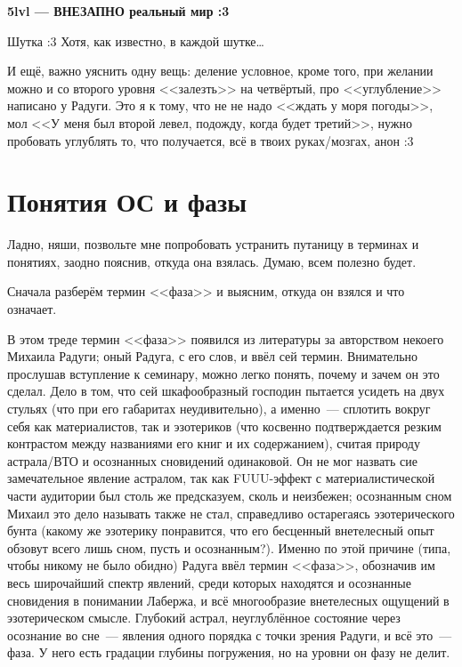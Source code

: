 \documentclass[a4paper,14pt,oneside]{memoir}
\begin{document}
\clearpage

\begin{center}
\textbf{5lvl — ВНЕЗАПНО реальный мир :3}
\end{center}


Шутка :3 Хотя, как известно, в каждой шутке\ldots
\medskip

И ещё, важно уяснить одну вещь: деление условное, кроме того, при желании можно и со второго  уровня <<залезть>> на четвёртый, про <<углубление>> написано у Радуги. Это я к тому, что не не надо <<ждать у моря погоды>>, мол <<У меня был второй левел, подожду, когда будет третий>>, нужно пробовать углублять то, что получается, всё в твоих руках/мозгах, анон :3



\section{Понятия ОС и фазы}


Ладно, няши, позвольте мне попробовать устранить путаницу в терминах и понятиях, заодно пояснив, откуда она взялась. Думаю, всем полезно будет. 

Сначала разберём термин <<фаза>> и выясним, откуда он взялся и что означает.

В этом треде термин <<фаза>> появился из литературы за авторством некоего Михаила Радуги; оный Радуга, с его слов, и ввёл сей термин. Внимательно прослушав вступление к семинару, можно легко понять, почему и зачем он это сделал. Дело в том, что сей шкафообразный господин пытается усидеть на двух стульях (что при его габаритах неудивительно), а именно~--- сплотить вокруг себя как материалистов, так и эзотериков (что косвенно подтверждается резким контрастом между названиями его книг и их содержанием), считая природу астрала/ВТО и осознанных сновидений одинаковой. Он не мог назвать сие замечательное явление астралом, так как FUUU-эффект с материалистической части аудитории был столь же предсказуем, сколь и неизбежен; осознанным сном Михаил это дело называть также не стал, справедливо остарегаясь эзотерического бунта (какому же эзотерику понравится, что его бесценный внетелесный опыт обзовут всего лишь сном, пусть и осознанным?). Именно по этой причине (типа, чтобы никому не было обидно) Радуга ввёл термин <<фаза>>, обозначив им весь широчайший спектр явлений, среди которых находятся и осознанные сновидения в понимании Лабержа, и всё многообразие внетелесных ощущений в эзотерическом смысле. Глубокий астрал, неуглублённое состояние через осознание во сне~--- явления одного порядка с точки зрения Радуги, и всё это~--- фаза. У него есть градации глубины погружения, но на уровни он фазу не делит.
\end{document}
